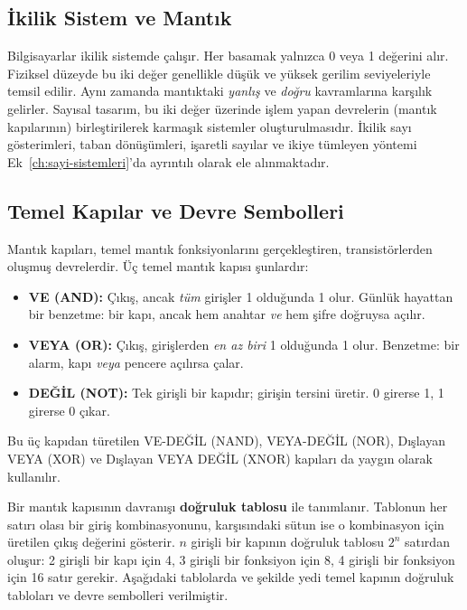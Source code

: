 \subsection{İkilik Sistem ve Mantık}

Bilgisayarlar ikilik sistemde çalışır. Her basamak yalnızca 0 veya 1 değerini alır. Fiziksel düzeyde bu iki değer genellikle düşük ve yüksek gerilim seviyeleriyle temsil edilir. Aynı zamanda mantıktaki \emph{yanlış} ve \emph{doğru} kavramlarına karşılık gelirler. Sayısal tasarım, bu iki değer üzerinde işlem yapan devrelerin (mantık kapılarının) birleştirilerek karmaşık sistemler oluşturulmasıdır. İkilik sayı gösterimleri, taban dönüşümleri, işaretli sayılar ve ikiye tümleyen yöntemi Ek~\ref{ch:sayi-sistemleri}'da ayrıntılı olarak ele alınmaktadır.


\subsection{Temel Kapılar ve Devre Sembolleri}

Mantık kapıları, temel mantık fonksiyonlarını gerçekleştiren, transistörlerden oluşmuş devrelerdir. Üç temel mantık kapısı şunlardır:

\begin{itemize}[nosep]
    \item \textbf{VE (AND):} Çıkış, ancak \emph{tüm} girişler 1 olduğunda 1 olur. Günlük hayattan bir benzetme: bir kapı, ancak hem anahtar \emph{ve} hem şifre doğruysa açılır.
    \item \textbf{VEYA (OR):} Çıkış, girişlerden \emph{en az biri} 1 olduğunda 1 olur. Benzetme: bir alarm, kapı \emph{veya} pencere açılırsa çalar.
    \item \textbf{DEĞİL (NOT):} Tek girişli bir kapıdır; girişin tersini üretir. 0 girerse 1, 1 girerse 0 çıkar.
\end{itemize}

Bu üç kapıdan türetilen VE-DEĞİL (NAND), VEYA-DEĞİL (NOR), Dışlayan VEYA (XOR) ve Dışlayan VEYA DEĞİL (XNOR) kapıları da yaygın olarak kullanılır.

Bir mantık kapısının davranışı \textbf{doğruluk tablosu} ile tanımlanır. Tablonun her satırı olası bir giriş kombinasyonunu, karşısındaki sütun ise o kombinasyon için üretilen çıkış değerini gösterir. $n$ girişli bir kapının doğruluk tablosu $2^n$ satırdan oluşur: 2 girişli bir kapı için 4, 3 girişli bir fonksiyon için 8, 4 girişli bir fonksiyon için 16 satır gerekir. Aşağıdaki tablolarda ve şekilde yedi temel kapının doğruluk tabloları ve devre sembolleri verilmiştir.

